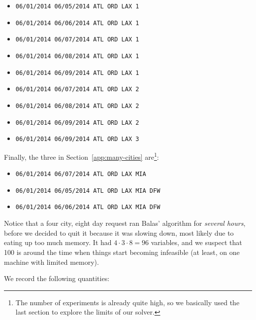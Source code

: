 \documentclass{article}
\begin{document}
\begin{itemize}[noitemsep]
    \item \texttt{06/01/2014 06/05/2014 ATL ORD LAX 1}
    \item \texttt{06/01/2014 06/06/2014 ATL ORD LAX 1}
    \item \texttt{06/01/2014 06/07/2014 ATL ORD LAX 1}
    \item \texttt{06/01/2014 06/08/2014 ATL ORD LAX 1}
    \item \texttt{06/01/2014 06/09/2014 ATL ORD LAX 1}
    \item \texttt{06/01/2014 06/07/2014 ATL ORD LAX 2}
    \item \texttt{06/01/2014 06/08/2014 ATL ORD LAX 2}
    \item \texttt{06/01/2014 06/09/2014 ATL ORD LAX 2}
    \item \texttt{06/01/2014 06/09/2014 ATL ORD LAX 3}
\end{itemize}

Finally, the three in Section~\ref{app:many-cities} are\footnote{The number of experiments is already quite high, so we basically used the last
section to explore the limits of our solver.}:

\begin{itemize}[noitemsep]
    \item \texttt{06/01/2014 06/07/2014 ATL ORD LAX MIA}
    \item \texttt{06/01/2014 06/05/2014 ATL ORD LAX MIA DFW}
    \item \texttt{06/01/2014 06/06/2014 ATL ORD LAX MIA DFW}
\end{itemize}

Notice that a four city, eight day request ran Balas' algorithm for \emph{several hours}, before we decided to quit it because it was slowing down,
most likely due to eating up too much memory. It had $4\cdot 3\cdot 8 = 96$ variables, and we suspect that 100 is around the time when things start
becoming infeasible (at least, on one machine with limited memory).

We record the following quantities:
\end{document}
